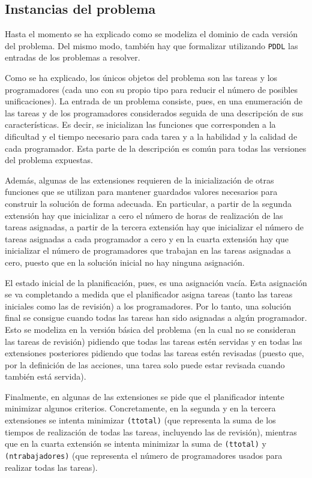 
\subsection{Instancias del problema} \label{sec:mod-inst}

Hasta el momento se ha explicado como se modeliza el dominio de cada versión 
del problema. Del mismo modo, también hay que formalizar utilizando 
\texttt{PDDL} las entradas de los problemas a resolver.

Como se ha explicado, los únicos objetos del problema son las tareas y los 
programadores (cada uno con su propio tipo para reducir el número de posibles 
unificaciones). La entrada de un problema consiste, pues, en una enumeración 
de las tareas y de los programadores considerados seguida de una descripción 
de sus características. Es decir, se inicializan las funciones que 
corresponden a la dificultad y el tiempo necesario para cada tarea y a la 
habilidad y la calidad de cada programador. Esta parte de la descripción es 
común para todas las versiones del problema expuestas.

Además, algunas de las extensiones requieren de la inicialización de otras 
funciones que se utilizan para mantener guardados valores necesarios para 
construir la solución de forma adecuada. En particular, a partir de la segunda 
extensión hay que inicializar a cero el número de horas de realización de las 
tareas asignadas, a partir de la tercera extensión hay que inicializar el 
número de tareas asignadas a cada programador a cero y en la cuarta extensión 
hay que inicializar el número de programadores que trabajan en las tareas 
asignadas a cero, puesto que en la solución inicial no hay ninguna asignación. 

El estado inicial de la planificación, pues, es una asignación vacía. Esta 
asignación se va completando a medida que el planificador asigna tareas (tanto 
las tareas iniciales como las de revisión) a los programadores. Por lo tanto, 
una solución final se consigue cuando todas las tareas han sido asignadas a 
algún programador. Esto se modeliza en la versión básica del problema (en la 
cual no se consideran las tareas de revisión) pidiendo que todas las tareas 
estén servidas y en todas las extensiones posteriores pidiendo que todas las 
tareas estén revisadas (puesto que, por la definición de las acciones, una 
tarea solo puede estar revisada cuando también está servida). 

Finalmente, en algunas de las extensiones se pide que el planificador intente 
minimizar algunos criterios. Concretamente, en la segunda y en la tercera 
extensiones se intenta minimizar \texttt{(ttotal)} (que representa la suma de 
los tiempos de realización de todas las tareas, incluyendo las de revisión), 
mientras que en la cuarta extensión se intenta minimizar la suma de 
\texttt{(ttotal)} y \texttt{(ntrabajadores)} (que representa el número de 
programadores usados para realizar todas las tareas). 




